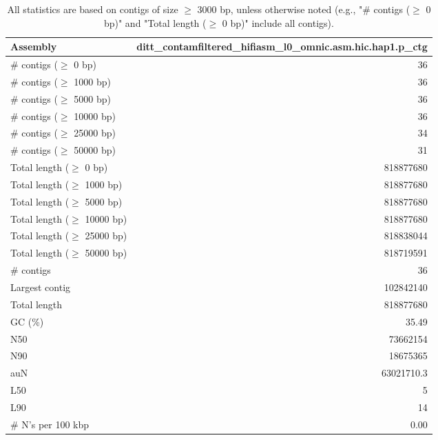 \documentclass[12pt,a4paper]{article}
\begin{document}
\begin{table}[ht]
\begin{center}
\caption{All statistics are based on contigs of size $\geq$ 3000 bp, unless otherwise noted (e.g., "\# contigs ($\geq$ 0 bp)" and "Total length ($\geq$ 0 bp)" include all contigs).}
\begin{tabular}{|l*{1}{|r}|}
\hline
Assembly & ditt\_contamfiltered\_hifiasm\_l0\_omnic.asm.hic.hap1.p\_ctg \\ \hline
\# contigs ($\geq$ 0 bp) & 36 \\ \hline
\# contigs ($\geq$ 1000 bp) & 36 \\ \hline
\# contigs ($\geq$ 5000 bp) & 36 \\ \hline
\# contigs ($\geq$ 10000 bp) & 36 \\ \hline
\# contigs ($\geq$ 25000 bp) & 34 \\ \hline
\# contigs ($\geq$ 50000 bp) & 31 \\ \hline
Total length ($\geq$ 0 bp) & 818877680 \\ \hline
Total length ($\geq$ 1000 bp) & 818877680 \\ \hline
Total length ($\geq$ 5000 bp) & 818877680 \\ \hline
Total length ($\geq$ 10000 bp) & 818877680 \\ \hline
Total length ($\geq$ 25000 bp) & 818838044 \\ \hline
Total length ($\geq$ 50000 bp) & 818719591 \\ \hline
\# contigs & 36 \\ \hline
Largest contig & 102842140 \\ \hline
Total length & 818877680 \\ \hline
GC (\%) & 35.49 \\ \hline
N50 & 73662154 \\ \hline
N90 & 18675365 \\ \hline
auN & 63021710.3 \\ \hline
L50 & 5 \\ \hline
L90 & 14 \\ \hline
\# N's per 100 kbp & 0.00 \\ \hline
\end{tabular}
\end{center}
\end{table}
\end{document}

